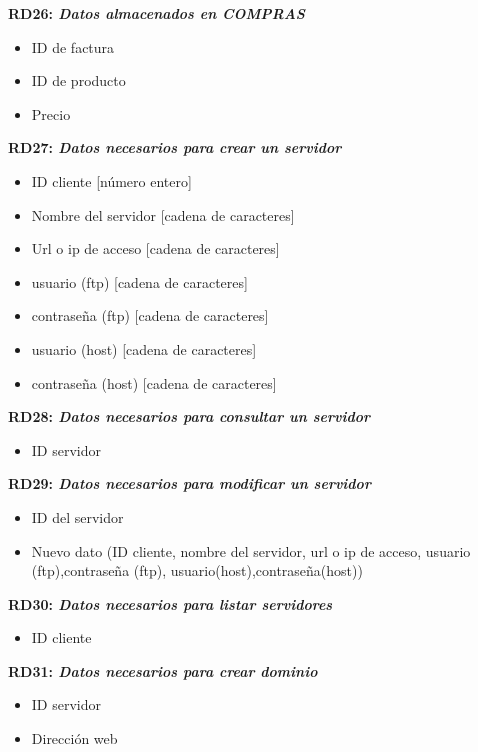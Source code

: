 \documentclass[paper=a4, fontsize=11pt, spanish]{scrartcl}
\begin{document}
	\setlength{\parindent}{0em}
	\textbf{RD26: \textit{Datos almacenados en COMPRAS}}
	\setlength{\parindent}{2em}
	\begin{itemize}
		\item ID de factura
		\item ID de producto
		\item Precio
	\end{itemize}

\setlength{\parindent}{0em}
\textbf{RD27: \textit{Datos necesarios para crear un servidor}}
\setlength{\parindent}{2em}
\begin{itemize}
  \item ID cliente [número entero]
  \item Nombre del servidor [cadena de caracteres]
  \item Url o ip de acceso [cadena de caracteres]
  \item usuario (ftp) [cadena de caracteres]
  \item contraseña (ftp) [cadena de caracteres]
  \item usuario (host) [cadena de caracteres]
  \item contraseña (host) [cadena de caracteres]
\end{itemize}

\setlength{\parindent}{0em}
\textbf{RD28: \textit{Datos necesarios para consultar un servidor}}
\setlength{\parindent}{2em}
\begin{itemize}
  \item ID servidor
\end{itemize}

\setlength{\parindent}{0em}
\textbf{RD29: \textit{Datos necesarios para modificar un servidor}}
\setlength{\parindent}{2em}
\begin{itemize}
  \item ID del servidor
  \item Nuevo dato (ID cliente, nombre del servidor, url o ip de acceso, usuario (ftp),contraseña (ftp), usuario(host),contraseña(host))
\end{itemize}

\setlength{\parindent}{0em}
\textbf{RD30: \textit{Datos necesarios para listar servidores}}
\setlength{\parindent}{2em}
\begin{itemize}
  \item ID cliente
\end{itemize}

\setlength{\parindent}{0em}
\textbf{RD31: \textit{Datos necesarios para crear dominio}}
\setlength{\parindent}{2em}
\begin{itemize}
  \item ID servidor
  \item Dirección web
\end{itemize}
\end{document}
